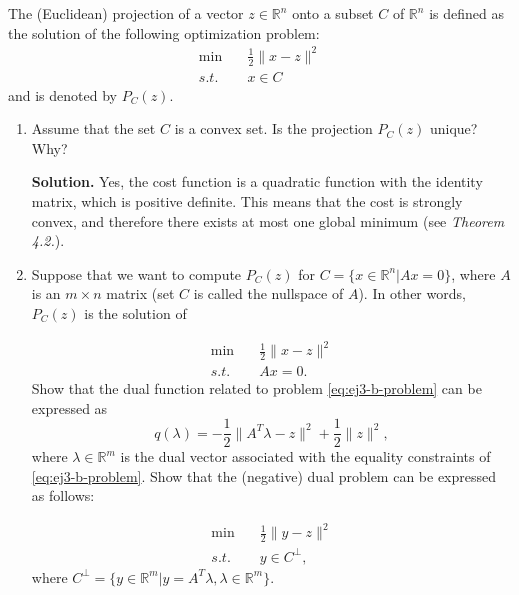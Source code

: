 \item The (Euclidean) projection of a vector $z\in \mathbb{R}^n$ onto a subset
  $C$ of $\mathbb{R}^n$ is defined as the solution of the following optimization
  problem:
  \begin{equation}
    \begin{aligned}
      \min \quad& \frac{1}{2} \|x-z\|^2 \\
      s.t. \quad& x\in C
    \end{aligned}
  \end{equation}
  and is denoted by $P_C(z)$.

  \begin{enumerate}[label=(\alph*)]
    \item Assume that the set $C$ is a convex set. Is the projection $P_C(z)$ 
      unique? Why?

      \medskip\textbf{Solution.} Yes, the cost function is a quadratic function
      with the identity matrix, which is positive definite. This means that the
      cost is strongly convex, and therefore there exists at most one global
      minimum (see \textit{Theorem 4.2.}).

    \item Suppose that we want to compute $P_C(z)$ for $C=\{x\in
      \mathbb{R}^n|Ax=0\}$, where $A$ is an $m\times n$ matrix (set $C$ is
      called the nullspace of $A$). In other words, $P_C(z)$ is the solution of

      \begin{equation}
        \label{eq:ej3-b-problem}
        \begin{aligned}
          \min \quad& \frac{1}{2} \|x-z\|^2 \\
          s.t. \quad& Ax=0
        .\end{aligned}
      \end{equation}
      Show that the dual function related to problem \autoref{eq:ej3-b-problem} can
      be expressed as
      \[
      q(\lambda)=-\frac{1}{2}\|A^T\lambda-z\|^2 + \frac{1}{2}\|z\|^2
      ,\] 
      where $\lambda\in \mathbb{R}^m$ is the dual vector associated with the
      equality constraints of \autoref{eq:ej3-b-problem}. Show that the (negative)
      dual problem can be expressed as follows:

      \begin{equation}
        \label{eq:ej3-b-dual-problem}
        \begin{aligned}
          \min \quad& \frac{1}{2} \|y-z\|^2 \\
          s.t. \quad& y\in C^\bot
        ,\end{aligned}
      \end{equation}
      where $C^\bot = \{y\in \mathbb{R}^m|y=A^T\lambda, \lambda\in
      \mathbb{R}^m\} $.


\end{enumerate}
